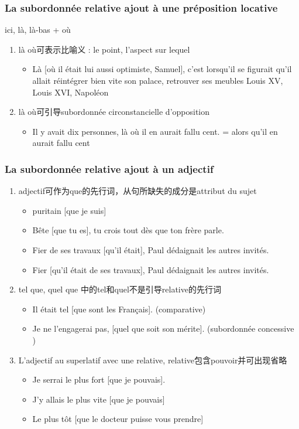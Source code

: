 \documentclass[UTF8]{report}
\begin{document}
\subsubsection{La subordonnée relative ajout à une préposition locative}
ici, là, là-bas + où
\begin{enumerate}
    \item là où可表示比喻义 : le point, l’aspect sur lequel
    \begin{itemize}
        \item Là [où il était lui aussi optimiste, Samuel], c’est lorsqu’il se figurait qu’il allait réintégrer bien vite son palace, retrouver ses meubles Louis XV, Louis XVI, Napoléon
    \end{itemize}
    \item là où可引导subordonnée circonstancielle d’opposition
    \begin{itemize}
        \item Il y avait dix personnes, là où il en aurait fallu cent. = alors qu’il en aurait fallu cent
    \end{itemize}
\end{enumerate}

\subsubsection{La subordonnée relative ajout à un adjectif}
\begin{enumerate}
    \item adjectif可作为que的先行词，从句所缺失的成分是attribut du sujet
    \begin{itemize}
        \item puritain [que je suis]
        \item Bête [que tu es], tu crois tout dès que ton frère parle.
        \item Fier de ses travaux [qu’il était], Paul dédaignait les autres invités.
        \item Fier [qu’il était de ses travaux], Paul dédaignait les autres invités.
    \end{itemize}
    \item tel que, quel que 中的tel和quel不是引导relative的先行词
    \begin{itemize}
        \item Il était tel [que sont les Français]. (comparative) 
        \item Je ne l’engagerai pas, [quel que soit son mérite]. (subordonnée concessive )
    \end{itemize}
    \item L’adjectif au superlatif avec une relative, relative包含pouvoir并可出现省略
    \begin{itemize}
        \item Je serrai le plus fort [que je pouvais].
        \item J’y allais le plus vite [que je pouvais]
        \item Le plus tôt [que le docteur puisse vous prendre]
    \end{itemize}
\end{enumerate}
\end{document}
